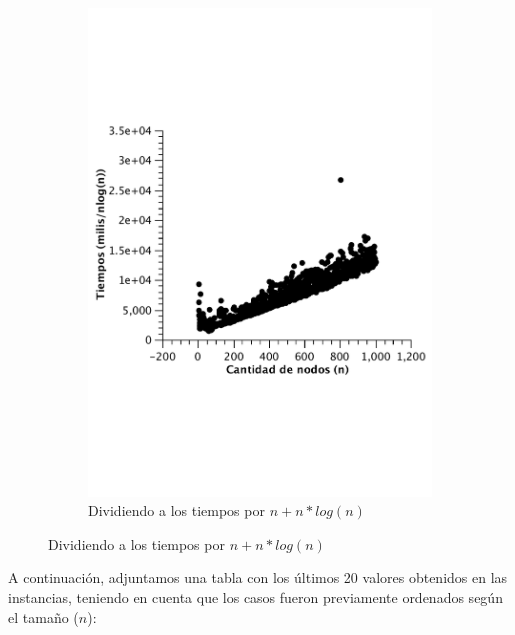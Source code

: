 \begin{figure}[H]
        \begin{subfigure}[b]{0.5\textwidth}
                \includegraphics[width=\textwidth]{imagenes/vacio-matriz-4.pdf}
                \caption{Dividiendo a los tiempos por $n + n*log(n)$}
        \end{subfigure}
\end{figure}

A continuación, adjuntamos una tabla con los últimos 20 valores obtenidos en las instancias, teniendo en cuenta que los casos fueron previamente ordenados según el tamaño ($n$):

